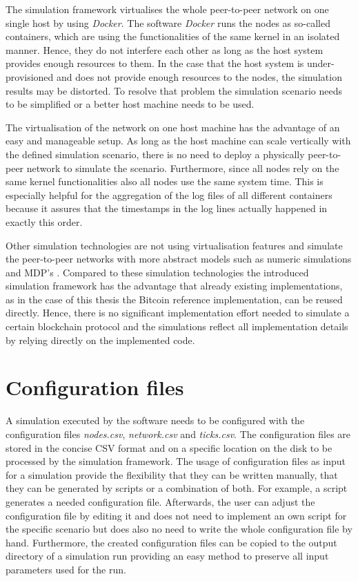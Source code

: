 The simulation framework virtualises the whole peer-to-peer network on one single host by using \textit{Docker}.
The software \textit{Docker} runs the nodes as so-called containers, which are using the functionalities of the same kernel in an isolated manner.
Hence, they do not interfere each other as long as the host system provides enough resources to them.
In the case that the host system is under-provisioned and does not provide enough resources to the nodes, the simulation results may be distorted.
To resolve that problem the simulation scenario needs to be simplified or a better host machine needs to be used.

The virtualisation of the network on one host machine has the advantage of an easy and manageable setup.
As long as the host machine can scale vertically with the defined simulation scenario, there is no need to deploy a physically peer-to-peer network to simulate the scenario.
Furthermore, since all nodes rely on the same kernel functionalities also all nodes use the same system time.
This is especially helpful for the aggregation of the log files of all different containers because it assures that the timestamps in the log lines actually happened in exactly this order.

Other simulation technologies are not using virtualisation features and simulate the peer-to-peer networks with more abstract models such as numeric simulations and MDP's \cite{eyal2014majority, bahack2013theoretical, gervais2015tampering, nayak2016stubborn, sapirshtein2016optimal, gervais2016security}. Compared to these simulation technologies the introduced simulation framework has the advantage that already existing implementations, as in the case of this thesis the Bitcoin reference implementation, can be reused directly.
Hence, there is no significant implementation effort needed to simulate a certain blockchain protocol and the simulations reflect all implementation details by relying directly on the implemented code.

\section{Configuration files}
\label{chap:config_files}

A simulation executed by the software needs to be configured with the configuration files \textit{nodes.csv}, \textit{network.csv} and \textit{ticks.csv}.
The configuration files are stored in the concise CSV format and on a specific location on the disk to be processed by the simulation framework.
The usage of configuration files as input for a simulation provide the flexibility that they can be written manually, that they can be generated by scripts or a combination of both.
For example, a script generates a needed configuration file.
Afterwards, the user can adjust the configuration file by editing it and does not need to implement an own script for the specific scenario but does also no need to write the whole configuration file by hand.
Furthermore, the created configuration files can be copied to the output directory of a simulation run providing an easy method to preserve all input parameters used for the run.

